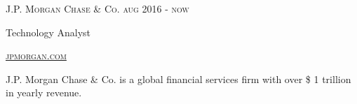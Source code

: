 {
  \textsc{\small{J.P. Morgan Chase \& Co. 
      \hfill
          {\raggedleft
              aug 2016 - now
          } \\
      }
  }
  {\raggedright\large {
    Technology Analyst
  } \\}

  \textsc{\small\href{http://www.jpmorgan.com}{jpmorgan.com}}

  \normalsize {
    J.P. Morgan Chase \& Co. is a global financial services firm with over
    \$ 1 trillion in yearly revenue.
  }
}
